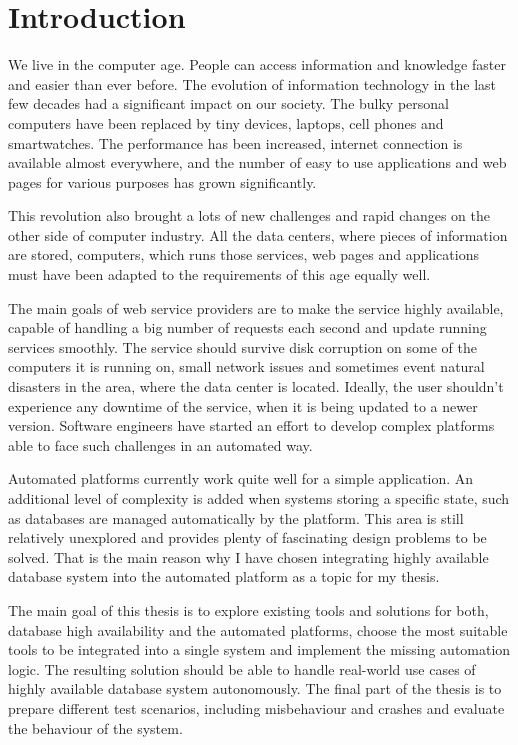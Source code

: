 \documentclass[
  digital, %
  twoside, %
  table,   %
  nolof,   %
  nolot,   %
]{fithesis3}
\begin{document}
\chapter{Introduction}
We live in the computer age. People can access information and knowledge faster and easier than ever before. The evolution of information technology in the last few decades had a significant impact on our society. The bulky personal computers have been replaced by tiny devices, laptops, cell phones and smartwatches. The performance has been increased, internet connection is available almost everywhere, and the number of easy to use applications and web pages for various purposes has grown significantly.

This revolution also brought a lots of new challenges and rapid changes on the other side of computer industry. All the data centers, where pieces of information are stored, computers, which runs those services, web pages and applications must have been adapted to the requirements of this age equally well.

The main goals of web service providers are to make the service highly available, capable of handling a big number of requests each second and update running services smoothly. The service should survive disk corruption on some of the computers it is running on, small network issues and sometimes event natural disasters in the area, where the data center is located. Ideally, the user shouldn't experience any downtime of the service, when it is being updated to a newer version. Software engineers have started an effort to develop complex platforms able to face such challenges in an automated way.

Automated platforms currently work quite well for a simple application. An additional level of complexity is added when systems storing a specific state, such as databases are managed automatically by the platform. This area is still relatively unexplored and provides plenty of fascinating design problems to be solved. That is the main reason why I have chosen integrating highly available database system into the automated platform as a topic for my thesis.

The main goal of this thesis is to explore existing tools and solutions for both, database high availability and the automated platforms, choose the most suitable tools to be integrated into a single system and implement the missing automation logic. The resulting solution should be able to handle real-world use cases of highly available database system autonomously. The final part of the thesis is to prepare different test scenarios, including misbehaviour and crashes and evaluate the behaviour of the system.
\end{document}
